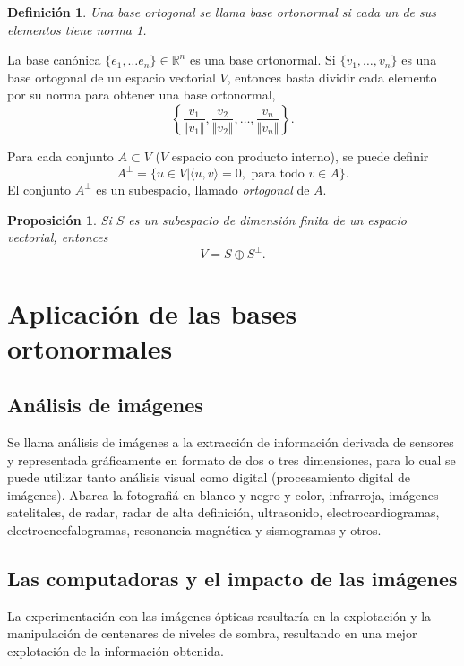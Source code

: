 \documentclass[b5paper, 11pt]{book}
\newcommand{\0}{\mathbf{0}}
\newcommand{\R}{\mathds{R}}
\theoremstyle{estiloB}
\theoremstyle{estiloC}
\newtheorem{unadefi}{Definición}[chapter]
\theoremstyle{estiloD}
\newtheorem{propo}{Proposición}[chapter]
\begin{document}
\begin{unadefi}
	Una base ortogonal se llama \textit{base ortonormal} si cada un de sus elementos tiene norma 1. 
\end{unadefi}

La base canónica $\{ e_{1}, \ldots e_{n} \} \in \R^{n}$ es una base ortonormal. Si $\{ v_{1}, \ldots , v_{n} \}$ es una base ortogonal de un espacio vectorial $V$, entonces basta dividir cada elemento por su norma para obtener una base ortonormal,
\[
\left\{ \dfrac{v_{1}}{\Vert v_{1} \Vert}, \dfrac{v_{2}}{\Vert v_{2} \Vert}, \ldots , \dfrac{v_{n}}{\Vert v_{n} \Vert} \right\}.
\]

Para cada conjunto $A \subset V$ ($V$ espacio con producto interno), se puede definir
\[
A^{\perp}= \{ u \in  V | \langle u,v \rangle =0, \text{ para todo } v \in A \}.
\]
El conjunto $A^{\perp}$ es un subespacio, llamado \textit{ortogonal} de $A$.

\begin{propo}
	Si $S$ es un subespacio de dimensión finita de un espacio vectorial, entonces
	\[
	V= S \oplus S^{\perp}.
	\]
\end{propo}

\section{Aplicación de las bases ortonormales}

\subsection{Análisis de imágenes}
Se llama análisis de imágenes a la extracción de información derivada de sensores y representada gráficamente en formato de dos o tres dimensiones, para lo cual se puede utilizar tanto análisis visual como digital (procesamiento digital de imágenes). Abarca la fotografiá en blanco y negro y color, infrarroja, imágenes satelitales, de radar, radar de alta definición, ultrasonido, electrocardiogramas, electroencefalogramas, resonancia magnética y sismogramas y otros.

\subsection{Las computadoras y el impacto de las imágenes}
La experimentación con las imágenes ópticas resultaría en la explotación y la manipulación de centenares de niveles de sombra, resultando en una mejor explotación de la información obtenida.
\end{document}
